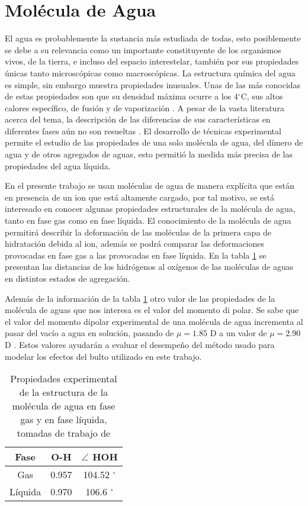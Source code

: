 \section{Molécula de Agua}
El agua es probablemente la sustancia más estudiada de todas, esto
posiblemente se debe a su relevancia como un importante constituyente
de los organismos vivos, de la tierra, e incluso del espacio 
interestelar, también por sus propiedades únicas tanto 
microscópicas como macroscópicas. La estructura química del 
agua es simple, sin embargo muestra propiedades inusuales. Unas de 
las más conocidas de estas propiedades son que su densidad máxima
ocurre a los 4$^{\circ}$C, sus altos calores específico, de 
fusión y de vaporización \citep{Mori1997}. A pesar de la vasta 
literatura acerca del tema, la descripción de las diferencias de 
sus características en diferentes fases aún no son resueltas 
\citep{Sain2000}. El desarrollo de técnicas experimental permite el
estudio de las propiedades de una solo molécula de agua, del 
dímero de agua y de otros agregados de aguas, esto permitió la
medida más precisa de las propiedades del agua líquida. 

En el presente trabajo se usan moléculas de agua de manera 
explícita que están en presencia de un ion que está altamente 
cargado, por tal motivo, se está interesado en conocer algunas
propiedades estructurales de la molécula de agua, tanto en fase gas
como en fase líquida. El conocimiento de la molécula de agua 
permitirá describir la deformación de las moléculas de la 
primera capa de hidratación debida al ion, además se podrá 
comparar las deformaciones provocadas en fase gas a las provocadas en
fase líquida. En la tabla \ref{tsf1} se presentan las distancias de
los hidrógenos al oxígenos de las moléculas de aguas en 
distintos estados de agregación. 

Además de la información de la tabla \ref{tsf1} otro valor de las
propiedades de la molécula de aguas que nos interesa es el valor 
del momento di polar. Se sabe que el valor del momento dipolar 
experimental de una molécula de agua incrementa al pasar del 
vacío a agua en solución, pasando de $\mu=1.85$ D 
\citep{Clou1973} a un valor de $\mu=2.90$ D \citep{Bady2000}. Estos
valores ayudarán a evaluar el desempeño del método usado para
modelar los efectos del bulto utilizado en este trabajo.

\begin{table}[h!]
\centering
\caption{\footnotesize Propiedades experimental de la estructura de 
la molécula de agua en fase gas y en fase líquida, tomadas de 
trabajo de \cite{Mori1997}}
\begin{tabular}{c|cc}\hline\hline
Fase      & O-H & $\angle$ HOH \\ \hline
Gas       & 0.957 & 104.52 $^{\circ}$ \\ 
Líquida & 0.970 & 106.6  $^{\circ}$ \\ 
\hline \end{tabular}\label{tsf1}\end{table}




